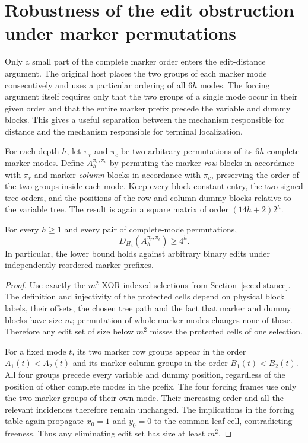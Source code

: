 \section{Robustness of the edit obstruction under marker permutations}
\label{sec:robust}
Only a small part of the complete marker order enters the edit-distance
argument.  The original host places the two groups of each marker
mode consecutively and uses a particular ordering of all $6h$ modes.
The forcing argument itself requires only that the two groups of a
single mode occur in their given order and that the entire marker
prefix precede the variable and dummy blocks. This gives a useful
separation between the mechanism responsible for distance and the
mechanism responsible for terminal localization.

For each depth $h$, let $\pi_r$ and $\pi_c$ be two arbitrary
permutations of its $6h$ complete marker modes. Define
$A_h^{\pi_r,\pi_c}$ by permuting the marker \emph{row} blocks in
accordance with $\pi_r$ and marker \emph{column} blocks in
accordance with $\pi_c$, preserving the order of the two groups
inside each mode. Keep every block-constant entry, the two signed
tree orders, and the positions of the row and column dummy blocks
relative to the variable tree. The result is again a square matrix
of order $(14h+2)2^h$.

\begin{proposition}
\label{prop:permuted}
For every $h\ge1$ and every pair of complete-mode permutations,
\[
 D_{H_4}(A_h^{\pi_r,\pi_c})\ge 4^h.
\]
In particular, the lower bound holds against arbitrary binary edits
under independently reordered marker prefixes.
\end{proposition}
\begin{proof}
Use exactly the $m^2$ XOR-indexed selections from
Section~\ref{sec:distance}. The definition and injectivity of the
protected cells depend on physical block labels, their offsets,
the chosen tree path and the fact that marker and dummy blocks have
size $m$; permutation of whole marker modes changes none of these.
Therefore any edit set of size below $m^2$ misses the protected cells
of one selection.

For a fixed mode $t$, its two marker row groups appear in the order
$A_1(t)<A_2(t)$ and its marker column groups in the order
$B_1(t)<B_2(t)$. All four groups precede every variable and dummy
position, regardless of the position of other complete modes in the
prefix. The four forcing frames use only the two marker groups of
their own mode. Their increasing order and all the relevant
incidences therefore remain unchanged. The implications in the
forcing table again propagate $x_0=1$ and $y_0=0$ to the common leaf
cell, contradicting freeness. Thus any eliminating edit set has
size at least $m^2$.
\end{proof}

